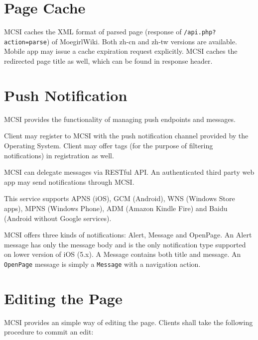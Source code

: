 \documentclass[a4paper,11pt]{report}
\begin{document}
\section{Page Cache}

MCSI caches the XML format of parsed page (response of \texttt{/api.php?action=parse}) of MoegirlWiki. Both zh-cn and zh-tw versions are available. Mobile app may issue a cache expiration request explicitly. MCSI caches the redirected page title as well, which can be found in response header.

\section{Push Notification}

MCSI provides the functionality of managing push endpoints and messages.

Client may register to MCSI with the push notification channel provided by the Operating System. Client may offer tags (for the purpose of filtering notifications) in registration as well.

MCSI can delegate messages via RESTful API. An authenticated third party web app may send notifications through MCSI.

This service supports APNS (iOS), GCM (Android), WNS (Windows Store apps), MPNS (Windows Phone), ADM (Amazon Kindle Fire) and Baidu (Android without Google services).

MCSI offers three kinds of notifications: Alert, Message and OpenPage. An \textsf{Alert} message has only the message body and is the only notification type supported on lower version of iOS (5.x).
A \textsf{Message} contains both title and message. An \texttt{OpenPage} message is simply a \texttt{Message} with a navigation action.


\section{Editing the Page}

MCSI provides an simple way of editing the page. Clients shall take the following procedure to commit an edit:
\end{document}
